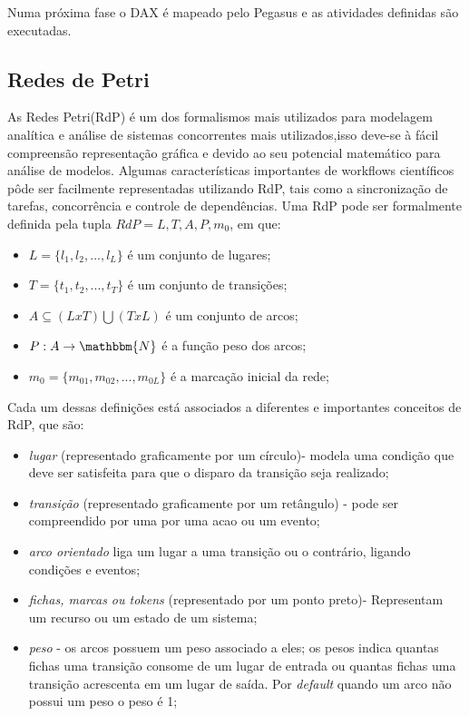 	Numa próxima fase o DAX é mapeado pelo Pegasus e as atividades definidas são executadas.
	
	\subsection{Redes de Petri}
		As Redes Petri(RdP) é um dos formalismos mais utilizados para modelagem analítica e análise de sistemas concorrentes mais utilizados,isso deve-se à fácil compreensão representação gráfica e devido ao seu potencial matemático para análise de modelos. Algumas características importantes de workflows científicos pôde ser facilmente representadas utilizando RdP, tais como a sincronização de tarefas, concorrência e controle de dependências\cite{Braghetto2011}.
		Uma RdP pode ser formalmente definida pela tupla $RdP={L,T,A,P,m_{0}}$, em que:
		\begin{itemize}
		\item $L=\{l_{1},l_{2},...,l_{L}\}$ é um conjunto de lugares;
		\item $T=\{t_{1},t_{2},...,t_{T}\}$ é um conjunto de transições;
		\item $A\subseteq(L x T)\bigcup (TxL)$ é um conjunto de arcos;
		\item $P: A \rightarrow \mathbbm{N}$ é a função peso dos arcos;
		\item $m_{0}=\{m_{01},m_{02},...,m_{0L}\}$ é a marcação inicial da rede;
		\end{itemize}
		
		Cada um dessas definições está associados a diferentes e importantes conceitos de RdP, que são:
		
			\begin{itemize}

				\item \textit{lugar} (representado graficamente por um círculo)- modela uma condição que deve ser satisfeita para que o disparo da transição seja realizado;

				\item \textit{transição} (representado graficamente por um retângulo) - pode ser compreendido por uma por uma acao ou um evento;

				\item \textit{arco orientado} liga um lugar a uma transição ou o contrário, ligando condições e eventos;

				\item \textit{fichas, marcas ou tokens} (representado por um ponto preto)- Representam um recurso ou um estado de um sistema;

				\item \textit{peso} - os arcos possuem um peso associado a eles; os pesos indica quantas fichas uma transição consome de um lugar de entrada ou quantas fichas uma transição acrescenta em um lugar de saída. Por \textit{default} quando um arco não possui um peso o peso é 1;
					
			\end{itemize}
			
